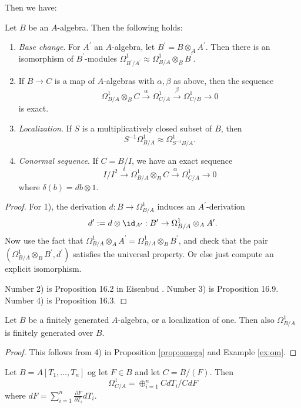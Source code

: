\documentclass[11pt, english]{article}
\begin{document}
Then we have:
\begin{prop}
\label{prop:omega}
Let $B$ be an $A$-algebra. Then the following holds:
\begin{enumerate}
\item
\emph{Base change}. For $A^\prime$ an $A$-algebra, let $B^\prime = B \otimes_A A^\prime$. Then there is an isomorphism of $B^\prime$-modules $\Omega_{B^\prime/A^\prime}^1 \approx \Omega_{B/A}^1 \otimes_B B^\prime$. 
\item
If $B \to C$ is a map of $A$-algebras with $\alpha,\beta$ as above, then the sequence
\[
\Omega_{B/A} ^1 \otimes_B C \xrightarrow{\alpha} \Omega_{C/A}^1 \xrightarrow{\beta} \Omega_{C/B}^1 \to 0
\]
is exact.
\item
\emph{Localization}. If $S$ is a multiplicatively closed subset of $B$, then
\[
S^{-1}\Omega_{B/A} ^1 \approx \Omega_{S^{-1}B/A} ^1.
\]
\item
\emph{Conormal sequence}. If $C=B/I$, we have an exact sequence
\[
I/I^2 \xrightarrow{\delta} \Omega_{B/A}^1 \otimes_B C \xrightarrow{\alpha} \Omega_{C/A} ^1 \to 0
\]
where $\delta(b)=db \otimes 1$.
\end{enumerate}
\end{prop}
\begin{proof}
For 1), the derivation $d:B \to \Omega_{B/A}^1$ induces an $A^\prime$-derivation
\[
d^\prime := d \otimes \id_{A^\prime}: B^\prime \to \Omega_{B/A}^1 \otimes_A A^\prime .
\]
Now use the fact that $\Omega_{B/A}^1 \otimes_A A^\prime = \Omega_{B/A} ^1 \otimes_B B^\prime$, and check that the pair $(\Omega_{B/A}^1 \otimes_B B^\prime, d^\prime)$ satisfies the universal property. Or else just compute an explicit isomorphism.

Number 2) is Proposition 16.2 in Eisenbud \cite{eisenbud}. Number 3) is Proposition 16.9. Number 4) is Proposition 16.3.
\end{proof} 

\begin{corr}
Let $B$ be a finitely generated $A$-algebra, or a localization of one. Then also $\Omega_{B/A}^1$ is finitely generated over $B$.
\end{corr}
\begin{proof}
This follows from 4) in Proposition \ref{prop:omega} and Example \ref{ex:om}.
\end{proof}  

\begin{example}
Let $B=A[T_1, \dotsc, T_n]$ og let $F \in B$ and let $C=B/(F)$. Then
\[
\Omega_{C/A} ^1 = \oplus_{i=1}^n CdT_i/CdF
\]
where $dF = \sum_{i=1}^n \frac{\partial F}{\partial T_i} dT_i$.
\end{example}
\end{document}
